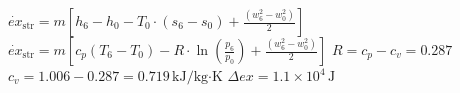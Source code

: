 \( \dot{ex}_{\text{str}} = m \left[ h_6 - h_0 - T_0 \cdot (s_6 - s_0) + \frac{(w_6^2 - w_0^2)}{2} \right] \)  
\( \dot{ex}_{\text{str}} = m \left[ c_p (T_6 - T_0) - R \cdot \ln \left( \frac{p_6}{p_0} \right) + \frac{(w_6^2 - w_0^2)}{2} \right] \)  
\( R = c_p - c_v = 0.287 \)  
\( c_v = 1.006 - 0.287 = 0.719 \, \text{kJ/kg·K} \)  
\( \Delta ex = 1.1 \times 10^4 \, \text{J} \)